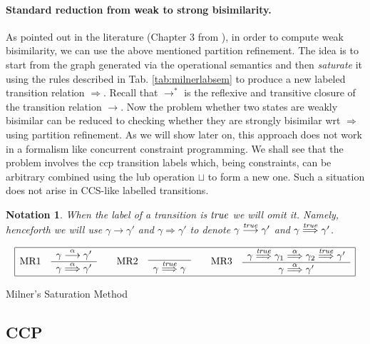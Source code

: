 \documentclass[copyright,creativecommons]{eptcs}
\newcommand{\true}{{\it true}}
\newcommand{\rrarrow}{\longrightarrow}
\newcommand{\trans}[1]{\stackrel{#1}{\rrarrow}}
\newcommand{\bigfrac}[2]{
\begin{array}{c}#1\\
\hline #2
\end{array}}
\newtheorem{notation}{Notation}
\newcommand{\newtrans}[1]{\stackrel{#1}{\Longrightarrow}}
\newcommand{\reds}{\rrarrow^*}
\newcommand{\A}{\alpha}
\newcommand{\G}{\gamma}
\begin{document}
\paragraph{Standard reduction from weak to strong bisimilarity.} \label{sssec:weakToStrong}
As pointed out in the literature (Chapter 3 from \cite{Sangiorgi:12:Book}),
in order to compute weak bisimilarity, we can use the above mentioned partition refinement.
The idea is to start from the graph generated via the operational semantics and then
\emph{saturate} it using the rules described in Tab. \ref{tab:milnerlabsem} to produce a new
labeled transition relation $\newtrans{}$.
Recall that  $\reds$ is the reflexive and transitive closure of the transition relation $\trans{}$.
Now the problem whether two states are weakly bisimilar can be reduced to checking whether
they are strongly bisimilar wrt $\newtrans{}$ using partition refinement.
As we will show later on, this approach does not work in a formalism like concurrent constraint programming.
We shall see that the problem involves the ccp transition labels which, being constraints, can be arbitrary combined
using the lub operation $\sqcup$  to form a new one. Such a situation does
not arise in CCS-like labelled transitions.

\begin{notation}
When the label of a transition is $\true$ we will omit it.
Namely, henceforth we will use $\G \trans{} \G'$ and $\G \newtrans{} \G'$
to denote $\G \trans{\true} \G'$ and $\G \newtrans{\true} \G'$.
\end{notation}






\begin{table}[tb]
\[\begin{array}{|c|}
\hline
\makebox{MR1} \quad \bigfrac{\G \trans{\A} \G'}{\G \newtrans{\A} \G'} \qquad
\makebox{MR2} \quad \bigfrac{}{\G \newtrans{\true} \G} \qquad
\makebox{MR3} \quad \bigfrac{\G \newtrans{\true} \G_1 \newtrans{\A} \G_2 \newtrans{\true} \G'}{\G \newtrans{\A} \G'} \\
\hline
\end{array}\]
\caption{Milner's Saturation Method}
\label{tab:milnerlabsem}
\end{table}


\subsection{CCP} \label{ssec:bisimCCP}
\end{document}
